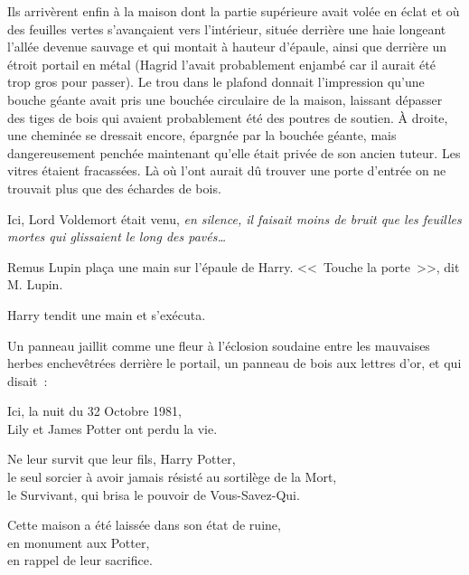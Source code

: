 Ils arrivèrent enfin à la maison dont la partie supérieure avait volée en éclat et où des feuilles vertes s'avançaient vers l'intérieur, située derrière une haie longeant l'allée devenue sauvage et qui montait à hauteur d'épaule, ainsi que derrière un étroit portail en métal (Hagrid l'avait probablement enjambé car il aurait été trop gros pour passer). Le trou dans le plafond donnait l'impression qu'une bouche géante avait pris une bouchée circulaire de la maison, laissant dépasser des tiges de bois qui avaient probablement été des poutres de soutien. À droite, une cheminée se dressait encore, épargnée par la bouchée géante, mais dangereusement penchée maintenant qu'elle était privée de son ancien tuteur. Les vitres étaient fracassées. Là où l'ont aurait dû trouver une porte d'entrée on ne trouvait plus que des échardes de bois.

Ici, Lord Voldemort était venu, \emph{en silence, il faisait moins de bruit que les feuilles mortes qui glissaient le long des pavés…}

Remus Lupin plaça une main sur l'épaule de Harry. <<~Touche la porte~>>, dit M. Lupin.

Harry tendit une main et s'exécuta.

Un panneau jaillit comme une fleur à l'éclosion soudaine entre les mauvaises herbes enchevêtrées derrière le portail, un panneau de bois aux lettres d'or, et qui disait~:
\begin{center}
Ici, la nuit du 32 Octobre 1981,\\
Lily et James Potter ont perdu la vie.

Ne leur survit que leur fils, Harry Potter,\\
le seul sorcier à avoir jamais résisté au sortilège de la Mort,\\
le Survivant, qui brisa le pouvoir de Vous-Savez-Qui.

Cette maison a été laissée dans son état de ruine,\\
en monument aux Potter,\\
en rappel de leur sacrifice.
\end{center}

